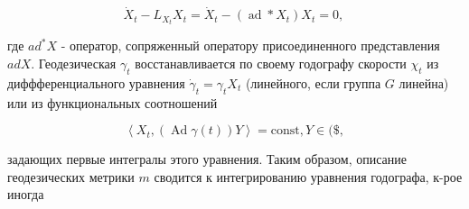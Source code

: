 \documentclass[10pt]{article}
\begin{document}
\[

\dot{X}_{t}-L_{X_{t}} X_{t}=\dot{X}_{t}-\left(\operatorname{ad} * X_{t}\right) X_{t}=0 \text {, }

\]



где $a d^{*} X$ - оператор, сопряженный оператору присоединенного представления $a d X$. Геодезическая $\gamma_{t}$ восстанавливается по своему годографу скорости $\chi_{t}$ из диффференциального уравнения $\dot{\gamma}_{t}=\gamma_{t} X_{t}$ (линейного, если группа $G$ линейна) или из функциональных соотношений



\[

\left\langle X_{t},(\operatorname{Ad} \gamma(t)) Y\right\rangle=\mathrm{const}, Y \in(\$,

\]



задающих первые интегралы этого уравнения. Таким образом, описание геодезических метрики $m$ сводится к интегрированию уравнения годографа, к-рое иногда
\end{document}
